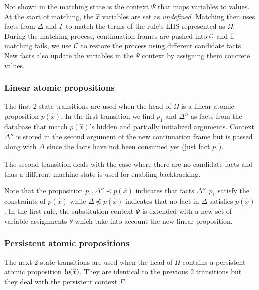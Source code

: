 Not shown in the matching state is the context $\Psi$ that maps variables to
values. At the start of matching, the $\widehat{x}$ variables are set as
\emph{undefined}. Matching then uses facts from $\Delta$ and $\Gamma$ to match
the terms of the rule's LHS represented as $\Omega$. During the matching
process, continuation frames are pushed into $\mathcal{C}$ and if matching fails,
we use $\mathcal{C}$ to restore the process using different candidate facts. New
facts also update the variables in the $\Psi$ context by assigning them concrete
values.

\subsubsection{Linear atomic propositions}

The first 2 state transitions are used when the head of $\Omega$ is a linear
atomic proposition $p(\widehat{x})$. In the first transition we find $p_1$ and
$\Delta''$ as facts from the database that match $p(\widehat{x})$'s hidden and
partially initialized arguments. Context $\Delta''$ is stored in the second
argument of the new continuation frame but is passed along with $\Delta$ since
the facts have not been consumed yet (just fact $p_1$).

The second transition deals with the case where there are no candidate facts and
thus a different machine state is used for enabling backtracking.

Note that the proposition $p_1, \Delta'' \prec p(\widehat{x})$ indicates that
facts $\Delta'', p_1$ satisfy the constraints of $p(\widehat{x})$ while $\Delta
\npreceq p(\widehat{x})$ indicates that no fact in $\Delta$ satisfies
$p(\widehat{x})$. In the first rule, the substitution context $\Psi$ is extended
with a new set of variable assignments $\theta$ which take into account the new
linear proposition.



\subsubsection{Persistent atomic propositions}

The next 2 state transitions are used when the head of $\Omega$ contains a
persistent atomic proposition ${!} p(\widehat{x})$. They are identical to the
previous 2 transitions but they deal with the persistent context $\Gamma$.




